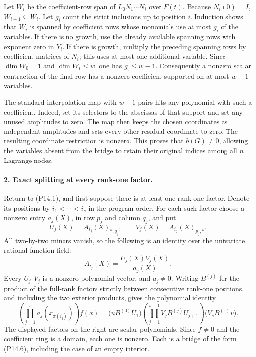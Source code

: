 Let $W_i$ be the coefficient-row span of
$L_0N_1\cdots N_i$ over $F(t)$. Because $N_i(0)=I$,
$W_{i-1}\subseteq W_i$. Let $g_i$ count the strict inclusions
up to position $i$. Induction shows that $W_i$ is spanned by
coefficient rows whose monomials use at most $g_i$ of the
variables. If there is no growth, use the already available
spanning rows with exponent zero in $Y_i$. If there is growth,
multiply the preceding spanning rows by coefficient matrices
of $N_i$; this uses at most one additional variable. Since
$\dim W_0=1$ and $\dim W_i\leq w$, one has $g_i\leq w-1$.
Consequently a nonzero scalar contraction of the final row
has a nonzero coefficient supported on at most $w-1$ variables.

The standard interpolation map with $w-1$ pairs hits any
polynomial with such a coefficient. Indeed, set its selectors
to the abscissas of that support and set any unused amplitudes
to zero. The map then keeps the chosen coordinates as independent
amplitudes and sets every other residual coordinate to zero.
The resulting coordinate restriction is nonzero. This proves
that $b(G)\ne0$, allowing the variables absent from the bridge
to retain their original indices among all $n$ Lagrange nodes.

\paragraph{2. Exact splitting at every rank-one factor.}
Return to (P14.1), and first suppose there is at least one rank-one
factor. Denote its positions by $i_1<\cdots<i_s$ in the program
order. For each such factor choose a nonzero entry $a_j(X)$,
in row $p_j$ and column $q_j$, and put
\[
 U_j(X)=A_{i_j}(X)_{*,q_j},\qquad
 V_j(X)=A_{i_j}(X)_{p_j,*}.
\]
All two-by-two minors vanish, so the following is an identity
over the univariate rational function field:
\[
 A_{i_j}(X)=\frac{U_j(X)V_j(X)}{a_j(X)}.
 \tag{P14.9}
\]
Every $U_j,V_j$ is a nonzero polynomial vector, and $a_j\ne0$.
Writing $B^{(j)}$ for the product of the full-rank factors
strictly between consecutive rank-one positions, and including
the two exterior products, gives the polynomial identity
\[
 \left(\prod_{j=1}^{s}a_j(x_{\pi(i_j)})\right) f(x)
   =\bigl(uB^{(0)}U_1\bigr)
      \left(\prod_{j=1}^{s-1}V_jB^{(j)}U_{j+1}\right)
       \bigl(V_sB^{(s)}v\bigr).
 \tag{P14.10}
\]
The displayed factors on the right are scalar polynomials.
Since $f\ne0$ and the coefficient ring is a domain, each one
is nonzero. Each is a bridge of the form (P14.6), including
the case of an empty interior.

